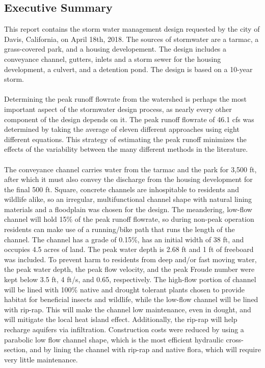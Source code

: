 \documentclass[11pt,letterpaper,final]{report}
\begin{document}
\begin{flushleft}

\setcounter{page}{0}

\chapter*{Executive Summary}


    This report contains the storm water management design requested by the city of Davis, California, on April 18th, 2018. The sources of stormwater are a tarmac, a grass-covered park, and a housing developement. The design includes a conveyance channel, gutters, inlets and a storm sewer for the housing development, a culvert, and a detention pond. The design is based on a 10-year storm. \\~\\

Determining the peak runoff flowrate from the watershed is perhaps the most important aspect of the stormwater design process, as nearly every other component of the design depends on it. The peak runoff flowrate of 46.1 cfs was determined by taking the average of eleven different approaches using eight different equations. This strategy of estimating the peak runoff minimizes the effects of the variability between the many different methods in the literature.\\~\\

The conveyance channel carries water from the tarmac and the park for 3,500 ft, after which it must also convey the discharge from the housing development for the final 500 ft. Square, concrete channels are inhospitable to residents and wildlife alike, so an irregular, multifunctional channel shape with natural lining materials and a floodplain was chosen for the design. The meandering, low-flow channel will hold 15\% of the peak runoff flowrate, so during non-peak operation residents can make use of a running/bike path that runs the length of the channel. The channel has a grade of 0.15\%, has an initial width of 38 ft, and occupies 4.5 acres of land. The peak water depth is 2.68 ft and 1 ft of freeboard was included. To prevent harm to residents from deep and/or fast moving water, the peak water depth, the peak flow velocity, and the peak Froude number were kept below 3.5 ft, 4 ft/s, and 0.65, respectively. The high-flow portion of channel will be lined with 100\% native and drought tolerant plants chosen to provide habitat for beneficial insects and wildlife, while the low-flow channel will be lined with rip-rap. This will make the channel low maintenance, even in dought, and will mitigate the local heat island effect. Additionally, the rip-rap will help recharge aquifers via infiltration. Construction costs were reduced by using a parabolic low flow channel shape, which is the most efficient hydraulic cross-section, and by lining the channel with rip-rap and native flora, which will require very little maintenance. \\~\\


\end{flushleft}
\end{document}
